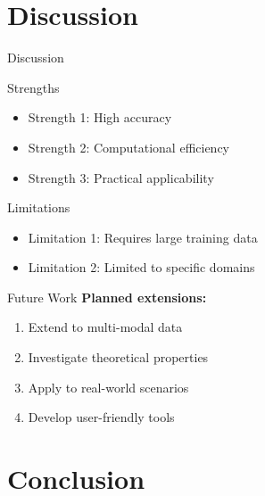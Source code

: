 \documentclass[aspectratio=169]{beamer}
\begin{document}

\section{Discussion}

\begin{frame}{Discussion}
    \begin{block}{Strengths}
        \begin{itemize}
            \item Strength 1: High accuracy
            \item Strength 2: Computational efficiency
            \item Strength 3: Practical applicability
        \end{itemize}
    \end{block}
    
    \vspace{0.3cm}
    
    \begin{alertblock}{Limitations}
        \begin{itemize}
            \item Limitation 1: Requires large training data
            \item Limitation 2: Limited to specific domains
        \end{itemize}
    \end{alertblock}
\end{frame}

\begin{frame}{Future Work}
    \textbf{Planned extensions:}
    \begin{enumerate}
        \item Extend to multi-modal data
        \item Investigate theoretical properties
        \item Apply to real-world scenarios
        \item Develop user-friendly tools
    \end{enumerate}
\end{frame}


\section{Conclusion}
\end{document}
